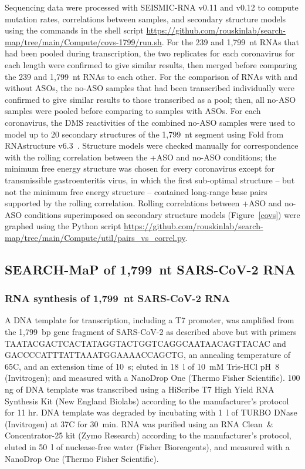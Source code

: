 \documentclass[main.tex]{subfiles}
\begin{document}
Sequencing data were processed with SEISMIC-RNA v0.11 and v0.12 to compute mutation rates, correlations between samples, and secondary structure models using the commands in the shell script \url{https://github.com/rouskinlab/search-map/tree/main/Compute/covs-1799/run.sh}.
For the 239 and 1,799~nt RNAs that had been pooled during transcription, the two replicates for each coronavirus for each length were confirmed to give similar results, then merged before comparing the 239 and 1,799~nt RNAs to each other.
For the comparison of RNAs with and without ASOs, the no-ASO samples that had been transcribed individually were confirmed to give similar results to those transcribed as a pool; then, all no-ASO samples were pooled before comparing to samples with ASOs.
For each coronavirus, the DMS reactivities of the combined no-ASO samples were used to model up to 20 secondary structures of the 1,799~nt segment using Fold from RNAstructure v6.3~\cite{Reuter2010}.
Structure models were checked manually for correspondence with the rolling correlation between the +ASO and no-ASO conditions; the minimum free energy structure was chosen for every coronavirus except for transmissible gastroenteritis virus, in which the first sub-optimal structure -- but not the minimum free energy structure -- contained long-range base pairs supported by the rolling correlation.
Rolling correlations between +ASO and no-ASO conditions superimposed on secondary structure models (Figure~\ref{covs}) were graphed using the Python script \url{https://github.com/rouskinlab/search-map/tree/main/Compute/util/pairs_vs_correl.py}.


\subsection{SEARCH-MaP of 1,799~nt SARS-CoV-2 RNA}

\subsubsection{RNA synthesis of 1,799~nt SARS-CoV-2 RNA}

A DNA template for transcription, including a T7 promoter, was amplified from the 1,799~bp gene fragment of SARS-CoV-2 as described above but with primers TAATACGACTCACTATAGGTACTGGTCAGGCAATAACAGTTACAC and GACCCCATTTATTAAATGGAAAACCAGCTG, an annealing temperature of 65\textdegree C, and an extension time of 10~s; eluted in 18~\textmu l of 10~mM Tris-HCl pH~8 (Invitrogen); and measured with a NanoDrop One (Thermo Fisher Scientific).
100 ng of DNA template was transcribed using a HiScribe T7 High Yield RNA Synthesis Kit (New England Biolabs) according to the manufacturer's protocol for 11 hr.
DNA template was degraded by incubating with 1~\textmu l of TURBO DNase (Invitrogen) at 37\textdegree C for 30~min.
RNA was purified using an RNA Clean~\& Concentrator-25 kit (Zymo Research) according to the manufacturer's protocol, eluted in 50~\textmu l of nuclease-free water (Fisher Bioreagents), and measured with a NanoDrop One (Thermo Fisher Scientific).
\end{document}
